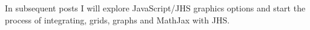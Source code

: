In subsequent posts I will explore JavaScript/JHS graphics options and
start the process of integrating, grids, graphs and MathJax with JHS.





%